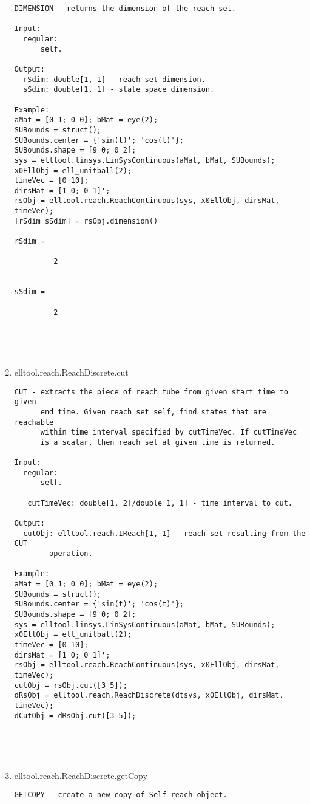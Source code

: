 \begin{enumerate}
\begin{lstlisting}
DIMENSION - returns the dimension of the reach set.

Input:
  regular:
      self.

Output:
  rSdim: double[1, 1] - reach set dimension.
  sSdim: double[1, 1] - state space dimension.

Example:
aMat = [0 1; 0 0]; bMat = eye(2);
SUBounds = struct();
SUBounds.center = {'sin(t)'; 'cos(t)'};
SUBounds.shape = [9 0; 0 2];
sys = elltool.linsys.LinSysContinuous(aMat, bMat, SUBounds);
x0EllObj = ell_unitball(2);
timeVec = [0 10];
dirsMat = [1 0; 0 1]';
rsObj = elltool.reach.ReachContinuous(sys, x0EllObj, dirsMat, timeVec);
[rSdim sSdim] = rsObj.dimension()

rSdim =

         2


sSdim =

         2





\end{lstlisting}
\fontfamily{\familydefault}
\selectfont
\item {elltool.reach.ReachDiscrete.cut}
\selectfont
\begin{lstlisting}
CUT - extracts the piece of reach tube from given start time to given
      end time. Given reach set self, find states that are reachable
      within time interval specified by cutTimeVec. If cutTimeVec
      is a scalar, then reach set at given time is returned.

Input:
  regular:
      self.

   cutTimeVec: double[1, 2]/double[1, 1] - time interval to cut.

Output:
  cutObj: elltool.reach.IReach[1, 1] - reach set resulting from the CUT
        operation.

Example:
aMat = [0 1; 0 0]; bMat = eye(2);
SUBounds = struct();
SUBounds.center = {'sin(t)'; 'cos(t)'};
SUBounds.shape = [9 0; 0 2];
sys = elltool.linsys.LinSysContinuous(aMat, bMat, SUBounds);
x0EllObj = ell_unitball(2);
timeVec = [0 10];
dirsMat = [1 0; 0 1]';
rsObj = elltool.reach.ReachContinuous(sys, x0EllObj, dirsMat, timeVec);
cutObj = rsObj.cut([3 5]);
dRsObj = elltool.reach.ReachDiscrete(dtsys, x0EllObj, dirsMat, timeVec);
dCutObj = dRsObj.cut([3 5]);





\end{lstlisting}
\fontfamily{\familydefault}
\selectfont
\item {elltool.reach.ReachDiscrete.getCopy}
\selectfont
\begin{lstlisting}
GETCOPY - create a new copy of Self reach object.


\end{lstlisting}
\end{enumerate}
